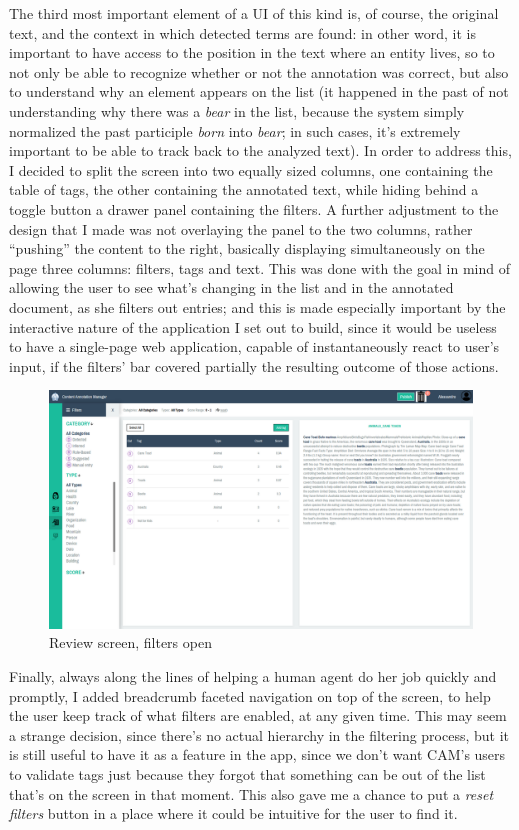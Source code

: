 \documentclass[12pt,svgnames]{memoir}
\begin{document}
The third most important element of a UI of this kind is, of course, the
original text, and the context in which detected terms are found: in
other word, it is important to have access to the position in the text
where an entity lives, so to not only be able to recognize whether or
not the annotation was correct, but also to understand why an element
appears on the list (it happened in the past of not understanding why
there was a \emph{bear} in the list, because the system simply
normalized the past participle \emph{born} into \emph{bear}; in such
cases, it's extremely important to be able to track back to the analyzed
text). In order to address this, I decided to split the screen into two
equally sized columns, one containing the table of tags, the other
containing the annotated text, while hiding behind a toggle button a
drawer panel containing the filters. A further adjustment to the design
that I made was not overlaying the panel to the two columns, rather
``pushing'' the content to the right, basically displaying
simultaneously on the page three columns: filters, tags and text. This
was done with the goal in mind of allowing the user to see what's
changing in the list and in the annotated document, as she filters out
entries; and this is made especially important by the interactive nature
of the application I set out to build, since it would be useless to have
a single-page web application, capable of instantaneously react to
user's input, if the filters' bar covered partially the resulting
outcome of those actions.

\begin{figure}[htbp]
\centering
\includegraphics{./src/img/review-open.png}
\caption{Review screen, filters open}
\end{figure}

Finally, always along the lines of helping a human agent do her job
quickly and promptly, I added breadcrumb faceted navigation on top of
the screen, to help the user keep track of what filters are enabled, at
any given time. This may seem a strange decision, since there's no
actual hierarchy in the filtering process, but it is still useful to
have it as a feature in the app, since we don't want CAM's users to
validate tags just because they forgot that something can be out of the
list that's on the screen in that moment. This also gave me a chance to
put a \emph{reset filters} button in a place where it could be intuitive
for the user to find it.
\end{document}
